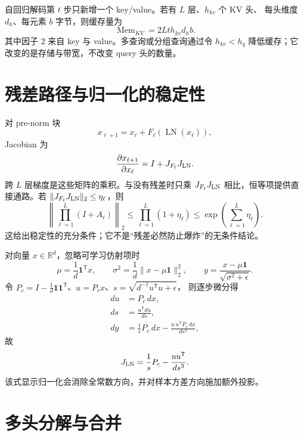 \documentclass[11pt]{article}
\numberwithin{equation}{section}
\newcommand{\R}{\mathbb{R}}
\newcommand{\1}{\mathbf{1}}
\newcommand{\T}{\mathsf{T}}
\begin{document}
自回归解码第 $t$ 步只新增一个 key/value。若有 $L$ 层、$h_{kv}$ 个 KV 头、
每头维度 $d_h$、每元素 $b$ 字节，则缓存量为
\begin{equation}
 \operatorname{Mem}_{KV}=2Lth_{kv}d_hb.
\end{equation}
其中因子 $2$ 来自 key 与 value。多查询或分组查询通过令
$h_{kv}<h_q$ 降低缓存；它改变的是存储与带宽，不改变 query 头的数量。

\section{残差路径与归一化的稳定性}

对 pre-norm 块
\begin{equation}
 x_{\ell+1}=x_\ell+F_\ell(\operatorname{LN}(x_\ell)),
\end{equation}
Jacobian 为
\begin{equation}
 \frac{\partial x_{\ell+1}}{\partial x_\ell}
 =I+J_{F_\ell}J_{\rm LN}.
\end{equation}
跨 $L$ 层梯度是这些矩阵的乘积。与没有残差时只乘
$J_{F_\ell}J_{\rm LN}$ 相比，恒等项提供直接通路。若
$\|J_{F_\ell}J_{\rm LN}\|_2\le\eta_\ell$，则
\begin{equation}
 \left\|\prod_{\ell=1}^{L}(I+A_\ell)\right\|_2
 \le\prod_{\ell=1}^{L}(1+\eta_\ell)
 \le\exp\!\left(\sum_{\ell=1}^{L}\eta_\ell\right).
\end{equation}
这给出稳定性的充分条件；它不是“残差必然防止爆炸”的无条件结论。

对向量 $x\in\R^d$，忽略可学习仿射项时
\begin{equation}
 \mu=\frac1d\1^{\T}x,\qquad
 \sigma^2=\frac1d\|x-\mu\1\|_2^2,\qquad
 y=\frac{x-\mu\1}{\sqrt{\sigma^2+\epsilon}}.
\end{equation}
令 $P_c=I-\frac1d\1\1^\T$、$u=P_cx$、$s=\sqrt{d^{-1}u^{\T}u+\epsilon}$，
则逐步微分得
\begin{align}
 du&=P_c\,dx,\\
 ds&=\frac{u^{\T}du}{d s},\\
 dy&=\frac1sP_c\,dx-\frac{u\,u^{\T}P_c\,dx}{d s^3},
\end{align}
故
\begin{equation}
 J_{\rm LN}=\frac1sP_c-\frac{uu^\T}{d s^3}.
\end{equation}
该式显示归一化会消除全常数方向，并对样本方差方向施加额外投影。

\section{多头分解与合并}
\end{document}
